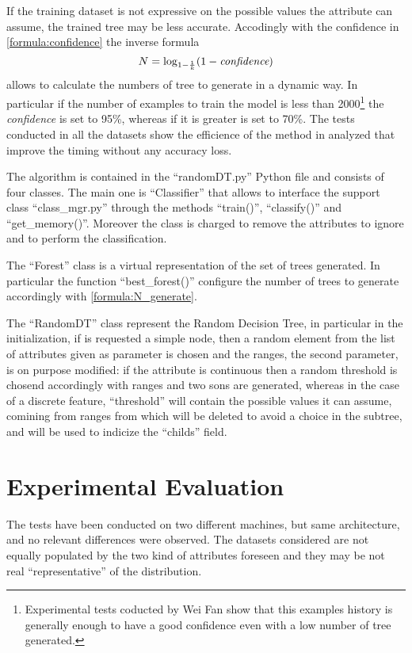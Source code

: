 \documentclass{acm_proc_article-sp-sigmod07}
\begin{document}
If the training dataset is not expressive on the possible values
the attribute can assume, the trained tree may be less accurate.
Accodingly with the confidence in \ref{formula:confidence} the inverse
formula
\begin{equation}
\label{formula:N_generate}
N = \log_{1-\frac{1}{k}}({1 - \emph{confidence}})
\end{equation}
allows to calculate the numbers of tree to generate in a dynamic way. In
 particular if the number of examples to train the model is less than
2000\footnote{Experimental tests coducted by Wei Fan show that this
examples history is generally enough to have a good confidence even with a
low number of tree generated.} the \emph{confidence} is set to 95\%,
whereas if it is greater is set to 70\%. The tests conducted in all the
datasets show the efficience of the method in analyzed that improve the
timing without any accuracy loss.

The algorithm is contained in the ``randomDT.py'' Python file and consists
of four classes. The main one is ``Classifier'' that allows to interface
the support class ``class_mgr.py'' through the methods ``train()'',
``classify()'' and ``get_memory()''. Moreover the class is charged to
remove the attributes to ignore and to perform the classification.

The ``Forest'' class is a virtual representation of the set of trees
generated. In particular the function ``best_forest()'' configure the
number of trees to generate accordingly with \ref{formula:N_generate}.

The ``RandomDT'' class represent the Random Decision Tree, in particular
in the initialization, if is requested a simple node, then a random
element from the list of attributes given as parameter is chosen and the
ranges, the second parameter, is on purpose modified: if the attribute is
continuous then a random threshold is chosend accordingly with
ranges and two sons are generated, whereas in the case of a discrete
feature, ``threshold'' will contain the possible values it can
assume, comining from ranges from which will be deleted to avoid a choice
in the subtree, and will be used to indicize the ``childs'' field.


\section{Experimental Evaluation}
The tests have been conducted on two different machines, but same
architecture, and no relevant differences were observed. The datasets
considered are not equally populated by the two kind of attributes
foreseen and they may be not real ``representative'' of the distribution.
\end{document}
